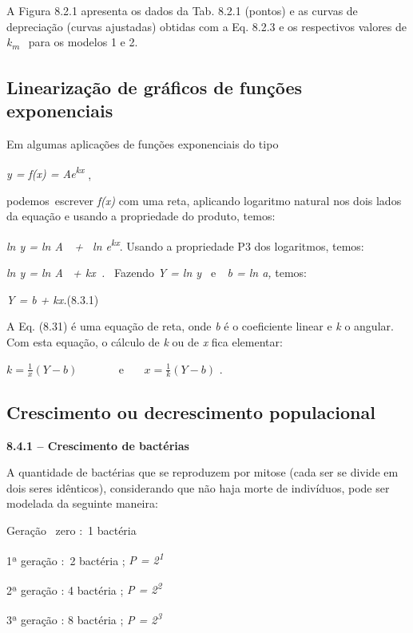 A Figura 8.2.1 apresenta os dados da Tab. 8.2.1 (pontos) e as curvas de depreciação (curvas ajustadas) obtidas com a Eq. 8.2.3 e os respectivos valores de \textit{k\textsubscript{m}}~ para os modelos 1 e 2.\qedsymbol{}

\subsection{Linearização de gráficos de funções exponenciais}

Em algumas aplicações de funções exponenciais do tipo 

\textit{y = f(x) = Ae\textsuperscript{kx}} , 

podemos~escrever  \textit{f(x)} com uma reta, aplicando logaritmo natural nos dois lados da equação e usando a propriedade do produto, temos:

\textit{ln y = ln A~~+~  ln e\textsuperscript{kx}}. Usando a propriedade P3 dos logaritmos, temos:

\textit{ln y = ln A~ + kx~.~  }Fazendo\textit{ Y = ln y~ }e\textit{~~b =  ln a, }temos:

\textit{Y = b + kx.\quad \quad \quad \quad \quad \quad \quad \quad \quad }(8.3.1)

A Eq. (8.31) é uma equação de reta, onde \textit{b} é o coeficiente linear e \textit{k} o angular. Com esta equação, o cálculo de \textit{k} ou de \textit{x} fica elementar:

\( k=\frac{1}{x} \left( Y-b \right)  \) ~~~~~~ e~~~  \( x=\frac{1}{k} \left( Y-b \right)  \) .

\subsection{Crescimento ou decrescimento populacional}

{\fontsize{14pt}{16.8pt}\selectfont \textbf{8.4.1 – Crescimento de bactérias }}

A quantidade de bactérias que se reproduzem por mitose (cada ser se divide em dois seres idênticos), considerando que não haja morte de indivíduos, pode ser modelada da seguinte maneira: 

Geração~ zero :~1 bactéria  

1ª geração :~2 bactéria  ; \textit{P = 2\textsuperscript{1}}

2ª geração : 4 bactéria ; \textit{P = 2\textsuperscript{2}}

3ª geração : 8 bactéria ; \textit{P = 2\textsuperscript{3}}

